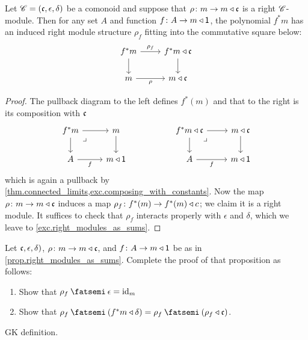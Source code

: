 \documentclass[Book-Poly]{subfiles}
\begin{document}
\begin{proposition}\label{prop.right_modules_as_sums}
Let $\mathscr{C}=(\mathfrak{c},\epsilon,\delta)$ be a comonoid and suppose that $\rho\colon m\to m\mathbin{\triangleleft}\mathfrak{c}$ is a right $\mathscr{C}$-module. Then for any set $A$ and function $f\colon A\to m\mathbin{\triangleleft}\textsf{1}$, the polynomial $f^*m$ has an induced right module structure $\rho_f$ fitting into the commutative square below:
\[
\begin{tikzcd}
  f^*m\ar[d]\ar[r, "\rho_f"]&
  f^*m\tri\ema{c}\ar[d]\\
  m\ar[r, "\rho"']&
  m\tri\ema{c}
\end{tikzcd}
\]
\end{proposition}
\begin{proof}
The pullback diagram to the left defines $f^*(m)$ and that to the right is its composition with $\mathfrak{c}$
\[
\begin{tikzcd}
	f^*m\ar[r]\ar[d]&
	m\ar[d]\\
	A\ar[r, "f"']&
	m\tri\1\ar[ul, phantom, very near end, "\lrcorner"]
\end{tikzcd}
\hspace{.7in}
\begin{tikzcd}
	f^*m\tri\ema{c}\ar[r]\ar[d]&
	m\tri\ema{c}\ar[d]\\
	A\ar[r, "f"']&
	m\tri\1\ar[ul, phantom, very near end, "\lrcorner"]
\end{tikzcd}
\]
which is again a pullback by \cref{thm.connected_limits,exc.composing_with_constants}. Now the map $\rho\colon m\to m\mathbin{\triangleleft}\mathfrak{c}$ induces a map $\rho_f\colon f^*(m)\to f^*(m)\mathbin{\triangleleft} c$; we claim it is a right module. It suffices to check that $\rho_f$ interacts properly with $\epsilon$ and $\delta$, which we leave to \cref{exc.right_modules_as_sums}.
\end{proof}

\begin{exercise}\label{exc.right_modules_as_sums}
Let $\mathfrak{c},\epsilon,\delta)$, $\rho\colon m\to m\mathbin{\triangleleft}\mathfrak{c}$, and $f\colon A\to m\mathbin{\triangleleft}\textsf{1}$ be as in \cref{prop.right_modules_as_sums}. Complete the proof of that proposition as follows:
\begin{enumerate}
	\item Show that $\rho_f\then\epsilon=\id_m$
	\item Show that $\rho_f\then(f^*m\tri\delta)=\rho_f\then(\rho_f\tri\ema{c})$.
\qedhere
\end{enumerate}
\end{exercise}

\begin{definition}
GK definition.
\end{definition}
\end{document}
